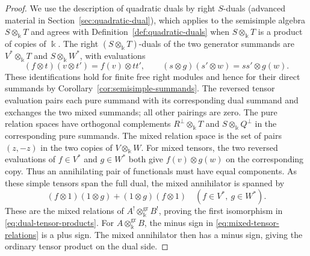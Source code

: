 \begin{advanced}[suppressfirstparskip=true,innertopmargin=0pt]
\begin{proof}
We use the description of quadratic duals by right $S$-duals (advanced material in Section~\ref{sec:quadratic-dual}), which applies to the semisimple algebra $S\otimes_\Bbbk T$ and agrees with Definition~\ref{def:quadratic-duals} when $S\otimes_\Bbbk T$ is a product of copies of $\Bbbk$.
The right $(S\otimes_\Bbbk T)$-duals of the two generator summands are $V^*\otimes_\Bbbk T$ and $S\otimes_\Bbbk W^*$, with evaluations
\[
(f\otimes t)(v\otimes t')=f(v)\otimes tt',\qquad
(s\otimes g)(s'\otimes w)=ss'\otimes g(w).
\]
These identifications hold for finite free right modules and hence for their direct summands by Corollary~\ref{cor:semisimple-summands}.
The reversed tensor evaluation pairs each pure summand with its corresponding dual summand and exchanges the two mixed summands; all other pairings are zero.
The pure relation spaces have orthogonal complements $R^\perp\otimes_\Bbbk T$ and $S\otimes_\Bbbk Q^\perp$ in the corresponding pure summands.
The mixed relation space is the set of pairs $(z,-z)$ in the two copies of $V\otimes_\Bbbk W$.
For mixed tensors, the two reversed evaluations of $f\in V^*$ and $g\in W^*$ both give $f(v)\otimes g(w)$ on the corresponding copy.
Thus an annihilating pair of functionals must have equal components. As these simple tensors span the full dual, the mixed annihilator is spanned by
\[
(f\otimes1)(1\otimes g)+(1\otimes g)(f\otimes1)
\quad(f\in V^*,\ g\in W^*).
\]
These are the mixed relations of $A^!\otimes_\Bbbk^{\mathrm{gr}}B^!$, proving the first isomorphism in \eqref{eq:dual-tensor-products}.
For $A\otimes_\Bbbk^{\mathrm{gr}}B$, the minus sign in \eqref{eq:mixed-tensor-relations} is a plus sign. The mixed annihilator then has a minus sign, giving the ordinary tensor product on the dual side.
\end{proof}


\end{advanced}
